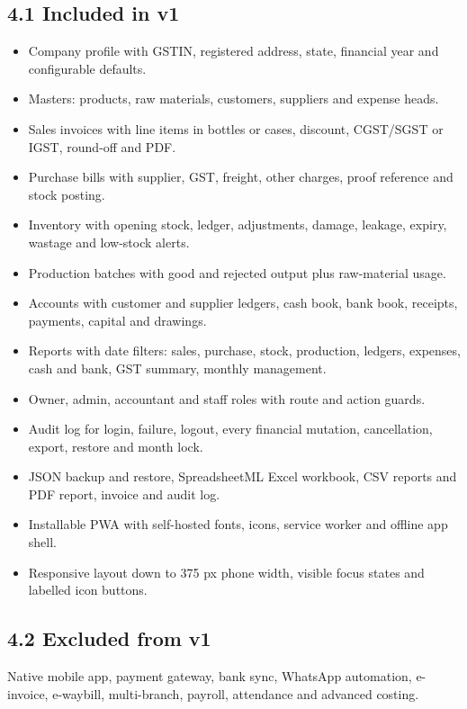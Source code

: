 \documentclass[11pt]{article}
\begin{document}
\subsection{4.1 Included in v1}
\begin{itemize}[leftmargin=*,itemsep=2pt,topsep=2pt]
\item Company profile with GSTIN, registered address, state, financial year and configurable defaults.
\item Masters: products, raw materials, customers, suppliers and expense heads.
\item Sales invoices with line items in bottles or cases, discount, CGST/SGST or IGST, round-off and PDF.
\item Purchase bills with supplier, GST, freight, other charges, proof reference and stock posting.
\item Inventory with opening stock, ledger, adjustments, damage, leakage, expiry, wastage and low-stock alerts.
\item Production batches with good and rejected output plus raw-material usage.
\item Accounts with customer and supplier ledgers, cash book, bank book, receipts, payments, capital and drawings.
\item Reports with date filters: sales, purchase, stock, production, ledgers, expenses, cash and bank, GST summary, monthly management.
\item Owner, admin, accountant and staff roles with route and action guards.
\item Audit log for login, failure, logout, every financial mutation, cancellation, export, restore and month lock.
\item JSON backup and restore, SpreadsheetML Excel workbook, CSV reports and PDF report, invoice and audit log.
\item Installable PWA with self-hosted fonts, icons, service worker and offline app shell.
\item Responsive layout down to 375 px phone width, visible focus states and labelled icon buttons.
\end{itemize}
\subsection{4.2 Excluded from v1}
Native mobile app, payment gateway, bank sync, WhatsApp automation, e-invoice, e-waybill, multi-branch, payroll, attendance and advanced costing.
\clearpage
\end{document}
